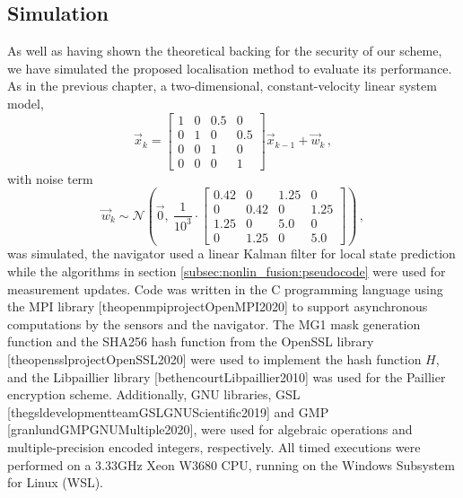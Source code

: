 \subsection{Simulation}\label{subsec:nonlin_fusion:simulation}
As well as having shown the theoretical backing for the security of our scheme, we have simulated the proposed localisation method to evaluate its performance. As in the previous chapter, a two-dimensional, constant-velocity linear system model,
\begin{equation}\label{eq:nonlin_fusion:simulation_system_model}
    \vec{x}_{k} = 
    \begin{bmatrix}
        1 & 0 & 0.5 & 0\\
        0 & 1 & 0   & 0.5\\
        0 & 0 & 1   & 0\\
        0 & 0 & 0   & 1
    \end{bmatrix}\vec{x}_{k-1} + \vec{w}_k\,,
\end{equation}
with noise term
\begin{equation}
    \vec{w}_k\sim\mathcal{N}\left(\vec{0},\ \frac{1}{10^{3}}\cdot
    \begin{bmatrix}
        0.42 & 0    & 1.25 & 0\\
        0    & 0.42 & 0    & 1.25\\
        1.25 & 0    & 5.0  & 0\\
        0    & 1.25 & 0    & 5.0
    \end{bmatrix}
    \right)\,,
\end{equation}
was simulated, the navigator used a linear Kalman filter for local state prediction while the algorithms in section \ref{subsec:nonlin_fusion:pseudocode} were used for measurement updates. Code was written in the C programming language using the MPI library [theopenmpiprojectOpenMPI2020] to support asynchronous computations by the sensors and the navigator. The MG1 mask generation function and the SHA256 hash function from the OpenSSL library [theopensslprojectOpenSSL2020] were used to implement the hash function $H$, and the Libpaillier library [bethencourtLibpaillier2010] was used for the Paillier encryption scheme. Additionally, GNU libraries, GSL [thegsldevelopmentteamGSLGNUScientific2019] and GMP [granlundGMPGNUMultiple2020], were used for algebraic operations and multiple-precision encoded integers, respectively. All timed executions were performed on a 3.33GHz Xeon W3680 CPU, running on the Windows Subsystem for Linux (WSL).

